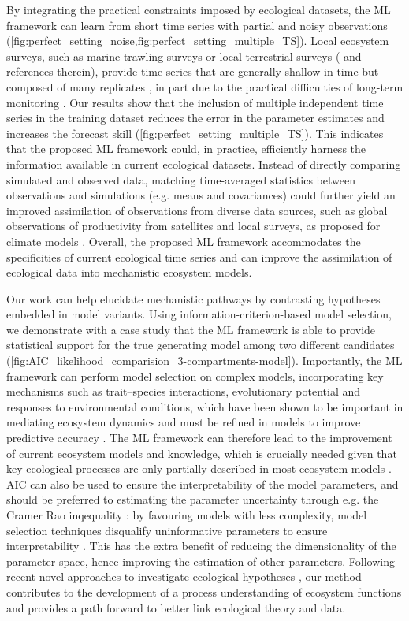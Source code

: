 By integrating the practical constraints imposed by ecological datasets, the ML framework can learn from short time series with partial and noisy observations (\cref{fig:perfect_setting_noise,fig:perfect_setting_multiple_TS}). 
% 
Local ecosystem surveys, such as marine trawling surveys or local terrestrial surveys (\cite{Pinsky2013,Dornelas2018,Burrows2019} and references therein), provide time series that are generally shallow in time but composed of many replicates \cite{Hsieh2008,Clark2015}, in part due to the practical difficulties of long-term monitoring \cite{Ye2016}. 
% 
Our results show that the inclusion of multiple independent time series in the training dataset reduces the error in the parameter estimates and increases the forecast skill (\cref{fig:perfect_setting_multiple_TS}). This indicates that the proposed ML framework could, in practice, efficiently harness the information available in current ecological datasets.
% 
Instead of directly comparing simulated and observed data, matching time-averaged statistics between observations and simulations (e.g. means and covariances) could further yield an improved assimilation of observations from diverse data sources, such as global observations of productivity from satellites and local surveys, as proposed for climate models \cite{Schneider2017}.
% 
Overall, the proposed ML framework accommodates the specificities of current ecological time series and can improve the assimilation of ecological data into mechanistic ecosystem models.

Our work can help elucidate mechanistic pathways by contrasting hypotheses embedded in model variants.
%
Using information-criterion-based model selection, we demonstrate with a case study that the ML framework is able to provide statistical support for the true generating model among two different candidates (\cref{fig:AIC_likelihood_comparision_3-compartments-model}).
% 
Importantly, the ML framework can perform model selection on complex models, incorporating key mechanisms such as trait--species interactions, evolutionary potential and responses to environmental conditions, which have been shown to be important in mediating ecosystem dynamics and must be refined in models to improve predictive accuracy \cite{Urban2016}.
% 
The ML framework can therefore lead to the improvement of current ecosystem models and knowledge, which is crucially needed given that key ecological processes are only partially described in most ecosystem models \cite{Schartau2017}.
% 
AIC can also be used to ensure the interpretability of the model parameters, and should be preferred to estimating the parameter uncertainty through e.g. the Cramer Rao inqequality \cite{Burnham2002}: by favouring models with less complexity, model selection techniques disqualify uninformative parameters to ensure interpretability \cite{Burnham2002}. This has the extra benefit of reducing the dimensionality of the parameter space, hence improving the estimation of other parameters. 
%
Following recent novel approaches to investigate ecological hypotheses \cite{Curtsdotter2019}, our method contributes to the development of a process understanding of ecosystem functions and provides a path forward to better link ecological theory and data.

